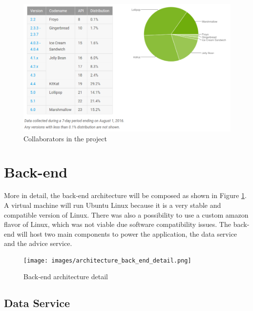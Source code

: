 \begin{figure}[H]
\begin{adjustbox}{width=1\textwidth,center=\textwidth}
  \centering
  \includegraphics[scale=1]{images/android_platform_versions.png}
\end{adjustbox}
  \caption[Collaborators in the project]{Collaborators in the project}
\end{figure}

\section{Back-end}
More in detail, the back-end architecture will be composed as shown in Figure \ref{fig:architecture_back_end_detail}. A virtual machine will run Ubuntu Linux because it is a very stable and compatible version of Linux. There was also a possibility to use a custom amazon flavor of Linux, which was not viable due software compatibility issues. The back-end will host two main components to power the application, the data service and the advice service. 

\begin{figure}[H]
\begin{adjustbox}{width=1\textwidth,center=\textwidth}
  \centering
  \texttt{[image: images/architecture\_back\_end\_detail.png]}
\end{adjustbox}
  \caption[Back-end architecture]{Back-end architecture detail}
  \label{fig:architecture_back_end_detail}
\end{figure}


\subsection{Data Service}

